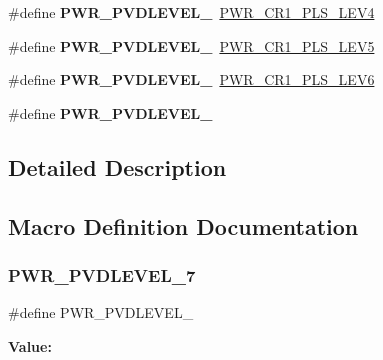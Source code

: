 \begin{DoxyCompactItemize}
\#define {\bfseries P\+W\+R\+\_\+\+P\+V\+D\+L\+E\+V\+E\+L\+\_}~\mbox{\hyperlink{group___peripheral___registers___bits___definition_ga3cd20cdf94731917fce93dfd4edbd779}{P\+W\+R\+\_\+\+C\+R1\+\_\+\+P\+L\+S\+\_\+\+L\+E\+V4}}
\item 
\mbox{\label{group___p_w_r___p_v_d__detection__level_ga46a1476440945c2b6426b4973172f24b}} 
\#define {\bfseries P\+W\+R\+\_\+\+P\+V\+D\+L\+E\+V\+E\+L\+\_}~\mbox{\hyperlink{group___peripheral___registers___bits___definition_gaf62a1df94e4815553b9f4d7a0ba8d38d}{P\+W\+R\+\_\+\+C\+R1\+\_\+\+P\+L\+S\+\_\+\+L\+E\+V5}}
\item 
\mbox{\label{group___p_w_r___p_v_d__detection__level_ga5dda7d0ac3fd3d606666455ca3c8f537}} 
\#define {\bfseries P\+W\+R\+\_\+\+P\+V\+D\+L\+E\+V\+E\+L\+\_}~\mbox{\hyperlink{group___peripheral___registers___bits___definition_ga9eb05102ebd0b1df9e1224e4dfa4f56f}{P\+W\+R\+\_\+\+C\+R1\+\_\+\+P\+L\+S\+\_\+\+L\+E\+V6}}
\item 
\#define {\bfseries P\+W\+R\+\_\+\+P\+V\+D\+L\+E\+V\+E\+L\+\_}
\end{DoxyCompactItemize}


\subsection{Detailed Description}


\subsection{Macro Definition Documentation}
\mbox{\label{group___p_w_r___p_v_d__detection__level_ga2c5cd8dd26b13bdf0164c1f7596b4bfd}} 
\subsubsection{\texorpdfstring{PWR\_PVDLEVEL\_7}{PWR\_PVDLEVEL\_7}}
{\footnotesize\ttfamily \#define P\+W\+R\+\_\+\+P\+V\+D\+L\+E\+V\+E\+L\+\_}

{\bfseries Value\+:}
\begin{DoxyCode}{0}
\DoxyCodeLine{\textcolor{comment}{                                                          (Compare internally to VREFINT) */}}

\end{DoxyCode}
